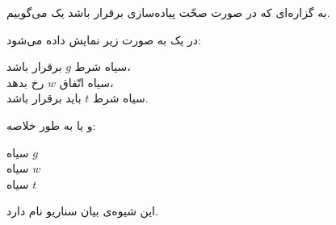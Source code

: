 

به گزاره‌ای که در صورت صحّت پیاده‌سازی برقرار باشد یک  می‌گوییم.

در  یک  به صورت زیر نمایش داده می‌شود:

{
‌سیاه{} شرط $g$ برقرار باشد، \\
‌سیاه{} اتّفاق $w$ رخ بدهد، \\
‌سیاه{} شرط $t$ باید برقرار باشد.
}

و یا به طور خلاصه:

{
‌سیاه{} $g$ \\
‌سیاه{} $w$ \\
‌سیاه{} $t$
}

این شیوه‌ی بیان سناریو  نام دارد.
